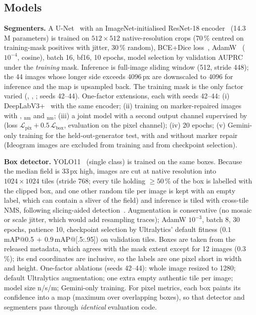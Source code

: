 \subsection{Models}
\textbf{Segmenters.} A U-Net~\cite{ronneberger2015unet} with an ImageNet-initialised ResNet-18 encoder~\cite{he2016resnet} (14.3\,M parameters) is trained on $512{\times}512$ native-resolution crops (70\,\% centred on training-mask positives with jitter, 30\,\% random), BCE+Dice loss~\cite{milletari2016vnet}, AdamW~\cite{loshchilov2019adamw} ($10^{-4}$, cosine), batch 16, bf16, 10 epochs, model selection by validation AUPRC under the \emph{training} mask. Inference is full-image sliding window (512, stride 448); the 44 images whose longer side exceeds 4096\,px are downscaled to 4096 for inference and the map is upsampled back. The training mask is the only factor varied (\GTb, \GTp, \GTg; seeds 42--44). One-factor extensions, each with seeds 42--44: (i) DeepLabV3+~\cite{chen2018deeplabv3plus} with the same encoder; (ii) training on marker-repaired images with \GTb, \GTp$_{\mathrm{nm}}$ and \GTg$_{\mathrm{nm}}$; (iii) a joint model with a second output channel supervised by \GTb{} (loss $\mathcal{L}_{\text{pix}}+0.5\,\mathcal{L}_{\text{box}}$, evaluation on the pixel channel); (iv) 20 epochs; (v) Gemini-only training for the held-out-generator test, with and without marker repair (Ideogram images are excluded from training and from checkpoint selection).

\textbf{Box detector.} YOLO11~\cite{jocher2024yolo11} (single class) is trained on the same \GTb{} boxes. Because the median field is 33\,px high, images are cut at native resolution into $1024{\times}1024$ tiles (stride 768; every tile holding $\ge50\,\%$ of the box is labelled with the clipped box, and one other random tile per image is kept with an empty label, which can contain a sliver of the field) and inference is tiled with cross-tile NMS, following slicing-aided detection~\cite{akyon2022sahi}. Augmentation is conservative (no mosaic or scale jitter, which would add resampling traces); AdamW $10^{-3}$, batch 8, 30 epochs, patience 10, checkpoint selection by Ultralytics' default fitness ($0.1\,$mAP@0.5$\,+\,0.9\,$mAP@[.5:.95]) on validation tiles. Boxes are taken from the released metadata, which agrees with the mask extent except for 12 images (0.3\,\%); its end coordinates are inclusive, so the labels are one pixel short in width and height. One-factor ablations (seeds 42--44): whole image resized to 1280; default Ultralytics augmentation; one extra empty authentic tile per image; model size n/s/m; Gemini-only training. For pixel metrics, each box paints its confidence into a map (maximum over overlapping boxes), so that detector and segmenters pass through \emph{identical} evaluation code.

